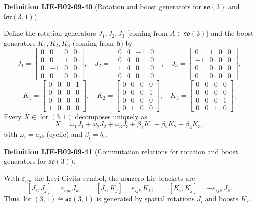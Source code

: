 \documentclass[10pt, letterpaper]{article}
\newcommand{\CustomHeading}[3]{%
  \par\medskip\noindent%
  \textbf{#1 #2} \textnormal{(#3)}.\enskip%
}
\newenvironment{DEF}[2]{\begin{unitbox}\CustomHeading{Definition}{#1}{#2}}{\end{unitbox}}
\begin{document}
\begin{DEF}{LIE-B02-09-40}{Rotation and boost generators for $\mathfrak{so}(3)$ and $\mathfrak{lor}(3,1)$}
Define the rotation generators \(J_1,J_2,J_3\) (coming from \(A\in\mathfrak{so}(3)\))
and the boost generators \(K_1,K_2,K_3\) (coming from \(\mathbf{b}\)) by
\[
J_1=
\begin{bmatrix}
0&0&0&0\\
0&0&1&0\\
0&-1&0&0\\
0&0&0&0
\end{bmatrix},\quad
J_2=
\begin{bmatrix}
0&0&-1&0\\
0&0&0&0\\
1&0&0&0\\
0&0&0&0
\end{bmatrix},\quad
J_3=
\begin{bmatrix}
0&1&0&0\\
-1&0&0&0\\
0&0&0&0\\
0&0&0&0
\end{bmatrix},
\]
\[
K_1=
\begin{bmatrix}
0&0&0&1\\
0&0&0&0\\
0&0&0&0\\
1&0&0&0
\end{bmatrix},\quad
K_2=
\begin{bmatrix}
0&0&0&0\\
0&0&0&1\\
0&0&0&0\\
0&1&0&0
\end{bmatrix},\quad
K_3=
\begin{bmatrix}
0&0&0&0\\
0&0&0&0\\
0&0&0&1\\
0&0&1&0
\end{bmatrix}.
\]
Every \(X\in\operatorname{lor}(3,1)\) decomposes uniquely as
\[
X=\omega_1 J_1+\omega_2 J_2+\omega_3 J_3+\beta_1 K_1+\beta_2 K_2+\beta_3 K_3,
\]
with \(\omega_i=a_{jk}\) (cyclic) and \(\beta_i=b_i\).
\end{DEF}



\begin{DEF}{LIE-B02-09-41}{Commutation relations for rotation and boost generators for $\mathfrak{so}(3)$}
With \(\varepsilon_{ijk}\) the Levi-Civita symbol, the nonzero Lie brackets are
\[
[J_i,J_j]=\varepsilon_{ijk}\,J_k,\qquad
[J_i,K_j]=\varepsilon_{ijk}\,K_k,\qquad
[K_i,K_j]=-\varepsilon_{ijk}\,J_k.
\]
Thus \(\operatorname{lor}(3,1)\cong \mathfrak{so}(3,1)\) is generated by spatial rotations \(J_i\)
and boosts \(K_i\).
\end{DEF}
\end{document}
